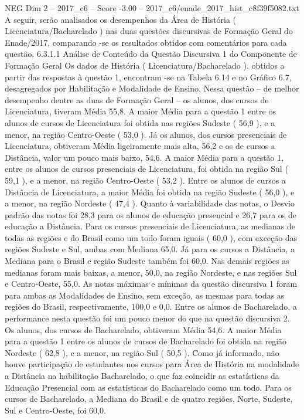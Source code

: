 \begin{textsample}{NEG Dim 2 – 2017\_c6 – Score -3.00 – 2017\_c6/enade\_2017\_hist\_c8f39f5082.txt}
A seguir, serão analisados os desempenhos da Área de História ( Licenciatura/Bacharelado ) nas duas questões discursivas de Formação Geral do Enade/2017, comparando -se os resultados obtidos com comentários para cada questão. 6.3.1.1 Análise de Conteúdo da Questão Discursiva 1 do Componente de Formação Geral Os dados de História ( Licenciatura/Bacharelado ), obtidos a partir das respostas à questão 1, encontram -se na Tabela 6.14 e no Gráfico 6.7, desagregados por Habilitação e Modalidade de Ensino.
Nessa questão – de melhor desempenho dentre as duas de Formação Geral – os alunos, dos cursos de Licenciatura, tiveram Média 55,8.
A maior Média para a questão 1 entre os alunos de cursos de Licenciatura foi obtida nas regiões Sudeste ( 56,9 ), e a menor, na região Centro-Oeste ( 53,0 ).
Já os alunos, dos cursos presenciais de Licenciatura, obtiveram Média ligeiramente mais alta, 56,2 e os de cursos a Distância, valor um pouco mais baixo, 54,6.
A maior Média para a questão 1, entre os alunos de cursos presenciais de Licenciatura, foi obtida na região Sul ( 59,1 ), e a menor, na região Centro-Oeste ( 53,2 ).
Entre os alunos de cursos a Distância de Licenciatura, a maior Média foi obtida na região Sudeste ( 56,0 ), e a menor, na região Nordeste ( 47,4 ).
Quanto à variabilidade das notas, o Desvio padrão das notas foi 28,3 para os alunos de educação presencial e 26,7 para os de educação a Distância.
Para os cursos presenciais de Licenciatura, as medianas de todas as regiões e do Brasil como um todo foram iguais ( 60,0 ), com exceção das regiões Sudeste e Sul, ambas com Mediana 65,0.
Já para os cursos a Distância, a Mediana para o Brasil e região Sudeste também foi 60,0.
Nas demais regiões as medianas foram mais baixas, a menor, 50,0, na região Nordeste, e nas regiões Sul e Centro-Oeste, 55,0.
As notas máximas e mínimas da questão discursiva 1 foram para ambas as Modalidades de Ensino, sem exceção, as mesmas para todas as regiões do Brasil, respectivamente, 100,0 e 0,0.
Entre os alunos de Bacharelado, a performance nesta questão foi um pouco menor do que na questão discursiva 2.
Os alunos, dos cursos de Bacharelado, obtiveram Média 54,6.
A maior Média para a questão 1 entre os alunos de cursos de Bacharelado foi obtida na região Nordeste ( 62,8 ), e a menor, na região Sul ( 50,5 ).
Como já informado, não houve participação de estudantes nos cursos para Área de História na modalidade a Distância na habilitação Bacharelado, o que faz coincidir as estatísticas da Educação Presencial com as estatísticas do Bacharelado como um todo.
Para os cursos de Bacharelado, a Mediana do Brasil e de quatro regiões, Norte, Sudeste, Sul e Centro-Oeste, foi 60,0.

\end{textsample}
